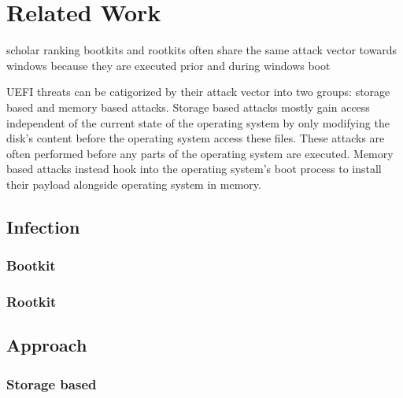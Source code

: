 
\chapter{Related Work}


scholar ranking
bootkits and rootkits often share the same attack vector towards windows because they are executed prior and during windows boot

UEFI threats can be catigorized by their attack vector into two groups: storage based and memory based attacks. Storage based attacks mostly gain access independent of the current state of the operating system by only modifying the disk's content before the operating system access these files. These attacks are often performed before any parts of the operating system are executed. Memory based attacks instead hook into the operating system's boot process to install their payload alongside operating system in memory.

\section{Infection}


\subsection{Bootkit}

\subsection{Rootkit}

\section{Approach}
\subsection{Storage based}

